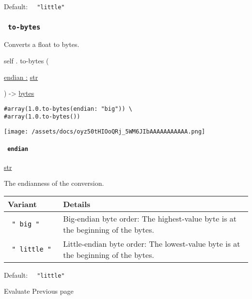 Default: \texttt{\ }{\texttt{\ "little"\ }}\texttt{\ }

\subsubsection{\texorpdfstring{\texttt{\ to-bytes\ }}{ to-bytes }}\label{definitions-to-bytes}

Converts a float to bytes.

self { . } { to-bytes } (

{ \hyperref[definitions-to-bytes-parameters-endian]{endian :}
\href{/docs/reference/foundations/str/}{str} }

) -\textgreater{} \href{/docs/reference/foundations/bytes/}{bytes}

\begin{verbatim}
#array(1.0.to-bytes(endian: "big")) \
#array(1.0.to-bytes())
\end{verbatim}

\texttt{[image: /assets/docs/oyz50tHIOoQRj\_5WM6JIbAAAAAAAAAAA.png]}

\paragraph{\texorpdfstring{\texttt{\ endian\ }}{ endian }}\label{definitions-to-bytes-endian}

\href{/docs/reference/foundations/str/}{str}

The endianness of the conversion.

\begin{longtable}[]{@{}ll@{}}
\toprule\noalign{}
Variant & Details \\
\midrule\noalign{}
\endhead
\bottomrule\noalign{}
\endlastfoot
\texttt{\ "\ big\ "\ } & Big-endian byte order: The highest-value byte
is at the beginning of the bytes. \\
\texttt{\ "\ little\ "\ } & Little-endian byte order: The lowest-value
byte is at the beginning of the bytes. \\
\end{longtable}

Default: \texttt{\ }{\texttt{\ "little"\ }}\texttt{\ }

\href{/docs/reference/foundations/eval/}{\pandocbounded{}}

{ Evaluate } { Previous page }

\href{/docs/reference/foundations/function/}{\pandocbounded{}}

